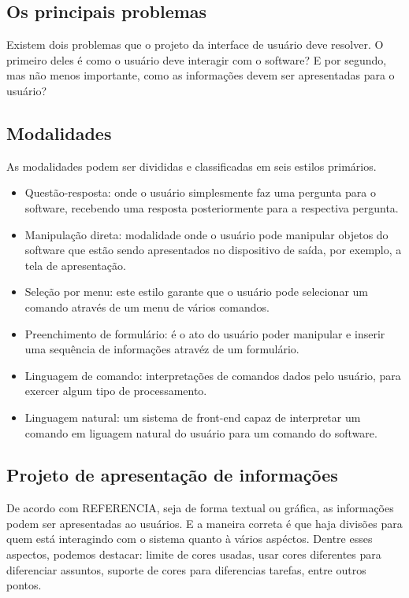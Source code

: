\subsection[Os principais problemas]{Os principais problemas}
Existem dois problemas que o projeto da interface de usuário deve resolver. O
primeiro deles é como o usuário deve interagir com o software? E por segundo, mas
não menos importante, como as informações devem ser apresentadas para o usuário?

\subsection[Modalidade]{Modalidades}
As modalidades podem ser divididas e classificadas em seis estilos primários.

\begin{itemize}
    \item Questão-resposta: onde o usuário simplesmente faz uma pergunta para o
        software, recebendo uma resposta posteriormente para a respectiva pergunta.

    \item Manipulação direta: modalidade onde o usuário pode manipular objetos
        do software que estão sendo apresentados no dispositivo de saída, por
        exemplo, a tela de apresentação.

    \item Seleção por menu: este estilo garante que o usuário pode selecionar um
        comando através de um menu de vários comandos.

    \item Preenchimento de formulário: é o ato do usuário poder manipular e inserir
        uma sequência de informações atravéz de um formulário.

    \item Linguagem de comando: interpretações de comandos dados pelo usuário,
        para exercer algum tipo de processamento.

    \item Linguagem natural: um sistema de front-end capaz de interpretar um
        comando em liguagem natural do usuário para um comando do software.
\end{itemize}

\subsection[Projeto de apresentação de informações]{Projeto de apresentação de informações}
De acordo com REFERENCIA, seja de forma textual ou gráfica, as informações podem
ser apresentadas ao usuários. E a maneira correta é que haja divisões para quem
está interagindo com o sistema quanto à vários aspéctos. Dentre esses aspectos,
podemos destacar: limite de cores usadas, usar cores diferentes para diferenciar
assuntos, suporte de cores para diferencias tarefas, entre outros pontos.
